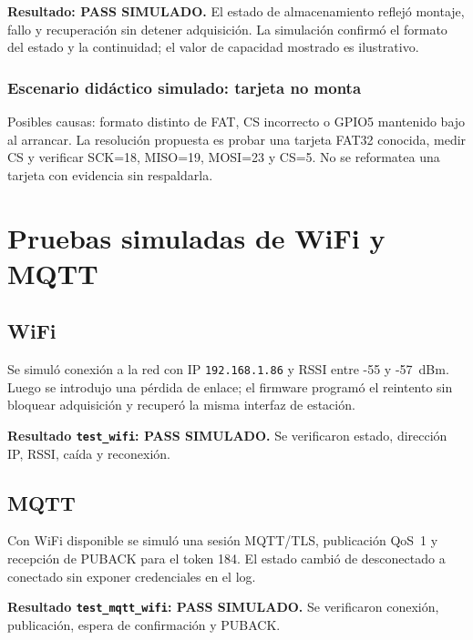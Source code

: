 \documentclass[11pt,a4paper,oneside]{report}
\begin{document}

\begin{vssimtest}
\textbf{Resultado: PASS SIMULADO.} El estado de almacenamiento reflejó montaje, fallo
y recuperación sin detener adquisición. La simulación confirmó el formato del estado
y la continuidad; el valor de capacidad mostrado es ilustrativo.
\end{vssimtest}

\subsection*{Escenario didáctico simulado: tarjeta no monta}
Posibles causas: formato distinto de FAT, CS incorrecto o GPIO5 mantenido bajo al
arrancar. La resolución propuesta es probar una tarjeta FAT32 conocida, medir CS y
verificar SCK=18, MISO=19, MOSI=23 y CS=5. No se reformatea una tarjeta con evidencia
sin respaldarla.

\chapter{Pruebas simuladas de WiFi y MQTT}

\section{WiFi}
Se simuló conexión a la red con IP \texttt{192.168.1.86} y RSSI entre -55 y -57~dBm.
Luego se introdujo una pérdida de enlace; el firmware programó el reintento sin
bloquear adquisición y recuperó la misma interfaz de estación.

\textbf{Resultado \texttt{test\_wifi}: PASS SIMULADO.} Se verificaron estado,
dirección IP, RSSI, caída y reconexión.

\section{MQTT}
Con WiFi disponible se simuló una sesión MQTT/TLS, publicación QoS~1 y recepción de
PUBACK para el token 184. El estado cambió de desconectado a conectado sin exponer
credenciales en el log.

\textbf{Resultado \texttt{test\_mqtt\_wifi}: PASS SIMULADO.} Se verificaron
conexión, publicación, espera de confirmación y PUBACK.

\end{document}
